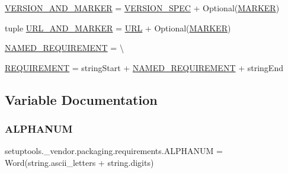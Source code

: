 \begin{DoxyCompactItemize}
\item 
\hyperlink{namespacesetuptools_1_1__vendor_1_1packaging_1_1requirements_a0303c649e539a54d4ddae9813689342e}{V\+E\+R\+S\+I\+O\+N\+\_\+\+A\+N\+D\+\_\+\+M\+A\+R\+K\+ER} = \hyperlink{namespacesetuptools_1_1__vendor_1_1packaging_1_1requirements_ac834744e2dbb435b5cb01d5d818bf143}{V\+E\+R\+S\+I\+O\+N\+\_\+\+S\+P\+EC} + Optional(\hyperlink{namespacesetuptools_1_1__vendor_1_1packaging_1_1requirements_a8720aaa659500c31754a1fad01b838b6}{M\+A\+R\+K\+ER})
\item 
tuple \hyperlink{namespacesetuptools_1_1__vendor_1_1packaging_1_1requirements_aeb7605debfdb9bb3c3b29df089141b97}{U\+R\+L\+\_\+\+A\+N\+D\+\_\+\+M\+A\+R\+K\+ER} = \hyperlink{namespacesetuptools_1_1__vendor_1_1packaging_1_1requirements_a5e20de54a9b111e067b1aaae33847ff0}{U\+RL} + Optional(\hyperlink{namespacesetuptools_1_1__vendor_1_1packaging_1_1requirements_a8720aaa659500c31754a1fad01b838b6}{M\+A\+R\+K\+ER})
\item 
\hyperlink{namespacesetuptools_1_1__vendor_1_1packaging_1_1requirements_a5b7312f112e58e2162ce34bec595bd13}{N\+A\+M\+E\+D\+\_\+\+R\+E\+Q\+U\+I\+R\+E\+M\+E\+NT} = \textbackslash{}
\item 
\hyperlink{namespacesetuptools_1_1__vendor_1_1packaging_1_1requirements_aee3bdd4f87cfc48192f7b5da9da5e2e2}{R\+E\+Q\+U\+I\+R\+E\+M\+E\+NT} = string\+Start + \hyperlink{namespacesetuptools_1_1__vendor_1_1packaging_1_1requirements_a5b7312f112e58e2162ce34bec595bd13}{N\+A\+M\+E\+D\+\_\+\+R\+E\+Q\+U\+I\+R\+E\+M\+E\+NT} + string\+End
\end{DoxyCompactItemize}


\subsection{Variable Documentation}
\mbox{\label{namespacesetuptools_1_1__vendor_1_1packaging_1_1requirements_a24fd8a5c9ee94835ecf93d35d824b5b8}} 
\subsubsection{\texorpdfstring{A\+L\+P\+H\+A\+N\+UM}{ALPHANUM}}
{\footnotesize\ttfamily setuptools.\+\_\+vendor.\+packaging.\+requirements.\+A\+L\+P\+H\+A\+N\+UM = Word(string.\+ascii\+\_\+letters + string.\+digits)}

